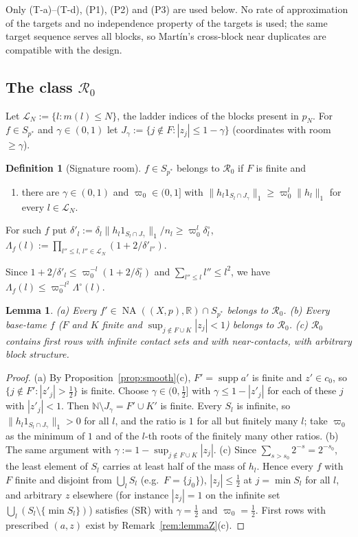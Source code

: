 \documentclass[10pt]{amsart}
\newtheorem{lemma}[theorem]{Lemma}
\theoremstyle{definition}
\newtheorem{definition}[theorem]{Definition}
\theoremstyle{remark}
\newcommand{\NA}{\operatorname{NA}}
\newcommand{\supp}{\operatorname{supp}}
\newcommand{\R}{\mathbb R}
\newcommand{\N}{\mathbb N}
\begin{document}
Only (T-a)--(T-d), (P1), (P2) and (P3) are used below.  No rate of
approximation of the targets and no independence property of the targets
is used; the same target sequence serves all blocks, so Mart\'in's
cross-block near duplicates are compatible with the design.

\subsection{The class $\mathcal R_0$}
Let $\mathcal L_N:=\{l:m(l)\le N\}$, the ladder indices of the blocks
present in $p_N$.  For $f\in S_{p^*}$ and $\gamma\in(0,1)$ let
$J_\gamma:=\{j\notin F:|z_j|\le1-\gamma\}$ (coordinates with room
$\ge\gamma$).

\begin{definition}[Signature room]\label{def:R0}
$f\in S_{p^*}$ belongs to $\mathcal R_0$ if $F$ is finite and
\begin{enumerate}
\item[(SR)] there are $\gamma\in(0,1)$ and $\varpi_0\in(0,1]$ with
$\|h_l1_{S_l\cap J_\gamma}\|_1\ge\varpi_0^l\|h_l\|_1$ for every
$l\in\mathcal L_N$.
\end{enumerate}
For such $f$ put $\delta'_l:=\delta_l\|h_l1_{S_l\cap J_\gamma}\|_1/n_l\ge
\varpi_0^l\delta^\circ_l$, $\Lambda_f(l):=\prod_{l''\le l,\,l''\in
\mathcal L_N}(1+2/\delta'_{l''})$.
\end{definition}

Since $1+2/\delta'_l\le\varpi_0^{-l}(1+2/\delta^\circ_l)$ and
$\sum_{l''\le l}l''\le l^2$, we have $\Lambda_f(l)\le\varpi_0^{-l^2}
\Lambda^\circ(l)$.

\begin{lemma}\label{lem:R0}
\textup{(a)} Every $f'\in\NA((X,p),\R)\cap S_{p^*}$ belongs to
$\mathcal R_0$.  \textup{(b)} Every \emph{base-tame} $f$ \textup{(}$F$ and
$K$ finite and $\sup_{j\notin F\cup K}|z_j|<1$\textup{)} belongs to
$\mathcal R_0$.  \textup{(c)} $\mathcal R_0$ contains first rows with
infinite contact sets and with near-contacts, with arbitrary block
structure.
\end{lemma}

\begin{proof}
(a) By Proposition~\ref{prop:smooth}(c), $F'=\supp a'$ is finite and
$z'\in c_0$, so $\{j\notin F':|z'_j|>\frac12\}$ is finite.  Choose
$\gamma\in(0,\frac12]$ with $\gamma\le1-|z'_j|$ for each of these $j$ with
$|z'_j|<1$.  Then $\N\setminus J_\gamma=F'\cup K'$ is finite.  Every $S_l$
is infinite, so $\|h_l1_{S_l\cap J_\gamma}\|_1>0$ for all $l$, and the
ratio is $1$ for all but finitely many $l$; take $\varpi_0$ as the
minimum of $1$ and of the $l$-th roots of the finitely many other ratios.
(b) The same argument with $\gamma:=1-\sup_{j\notin F\cup K}|z_j|$.
(c) Since $\sum_{s>s_0}2^{-s}=2^{-s_0}$, the least element of $S_l$ carries
at least half of the mass of $h_l$.  Hence every $f$ with $F$ finite and
disjoint from $\bigcup_lS_l$ (e.g.\ $F=\{j_0\}$),
$|z_j|\le\frac12$ at $j=\min S_l$ for all $l$, and arbitrary $z$
elsewhere (for instance $|z_j|=1$ on the infinite set
$\bigcup_l(S_l\setminus\{\min S_l\})$) satisfies (SR) with $\gamma=\frac12$
and $\varpi_0=\frac12$.  First rows with prescribed $(a,z)$ exist by
Remark~\ref{rem:lemmaZ}(c).
\end{proof}
\end{document}
